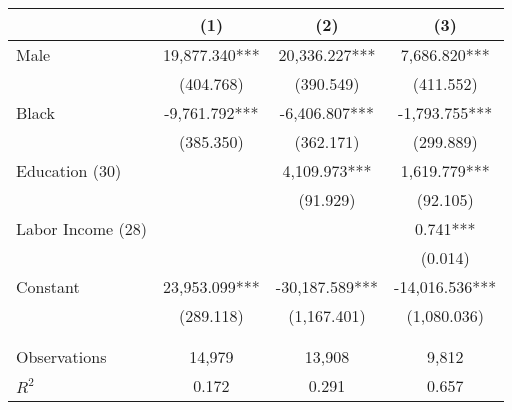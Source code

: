 \begin{tabular}{lccc} \toprule
 & (1) & (2) & (3) \\ \midrule
Male & 19,877.340*** & 20,336.227*** & 7,686.820*** \\
 & (404.768) & (390.549) & (411.552) \\
Black & -9,761.792*** & -6,406.807*** & -1,793.755*** \\
 & (385.350) & (362.171) & (299.889) \\
Education (30)  &  & 4,109.973*** & 1,619.779*** \\
 &  & (91.929) & (92.105) \\
Labor Income (28) &  &  & 0.741*** \\
 &  &  & (0.014) \\
Constant & 23,953.099*** & -30,187.589*** & -14,016.536*** \\
 & (289.118) & (1,167.401) & (1,080.036) \\
 &  &  &  \\ \\ \midrule
Observations & 14,979 & 13,908 & 9,812 \\
$R^2$ & 0.172 & 0.291 & 0.657 \\ \bottomrule
\end{tabular}
